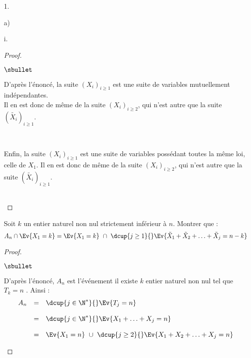 \documentclass[11pt]{article}%
\begin{document}
\begin{noliste}{1.}
\begin{noliste}{a)}
\begin{nonoliste}{i.}
      \begin{proof}~%
        \begin{noliste}{$\sbullet$}
        \item D'après l'énoncé, la suite $(X_i)_{i \geq 1}$ est une
          suite de variables mutuellement indépendantes.\\
          Il en est donc de même de la suite $(X_{i})_{i \geq 2}$, qui
          n'est autre que la suite $(\tilde{X_{i}})_{i \geq 1}$.%

        \item ~\\[-.8cm]

        \item Enfin, la suite $(X_i)_{i \geq 1}$ est une suite de
          variables possédant toutes la même loi, celle de $X_1$. Il
          en est donc de même de la suite $(X_{i})_{i \geq 2}$, qui
          n'est autre que la suite $(\tilde{X_{i}})_{i \geq 1}$.%
        \end{noliste}%
        ~\\[-1.2cm]
      \end{proof}

    \item Soit $k$ un entier naturel non nul strictement inférieur à
      $n$. Montrer que :
      \[
      A_n \cap \Ev{X_1=k}=\Ev{X_1=k} \ \cap \ \dcup{j \geq 1}{}
      \Ev{\tilde{X}_1+\tilde{X}_2+ \ldots +\tilde{X}_j=n-k}
      \]

      \begin{proof}~%
        \begin{noliste}{$\sbullet$}
        \item D'après l'énoncé, $A_n$ est l'événement \og il existe
          $k$ entier naturel non nul tel que $T_k = n$ \fg{}. Ainsi :
          \[
          \begin{array}{rcl}
            A_n & = & \dcup{j \in \N^*}{} \Ev{T_j = n}
            \\[.4cm]
            & = & \dcup{j \in \N^*}{} \Ev{X_1 + \ldots + X_j = n}
            \\[.4cm]
            & = & \Ev{X_1 = n} \ \cup \ \dcup{j \geq 2}{} \Ev{X_1 +
              X_2 + \ldots + X_j = n} 
          \end{array}
          \]


\end{noliste}
\end{proof}
\end{nonoliste}
\end{noliste}
\end{noliste}
\end{document}
